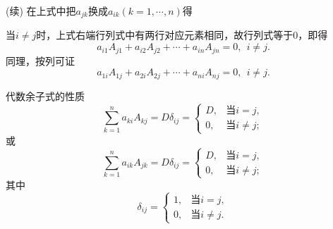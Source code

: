 \begin{frame}
  \begin{footnotesize}
    \proofname(续)
    在上式中把$a_{jk}$换成$a_{ik}(k=1,\cdots,n)$得
    \begin{center}
    \end{center}
    当$i\ne j$时，上式右端行列式中有两行对应元素相同，故行列式等于0，即得
    $$
    a_{i1} A_{j1} + a_{i2} A_{j2} + \cdots + a_{in} A_{jn} = 0, \ \ i\ne j.
    $$
    同理，按列可证
    $$
    a_{1i} A_{1j} + a_{2i} A_{2j} + \cdots + a_{ni} A_{nj} = 0, \ \ i\ne j.
    $$

  \end{footnotesize}
\end{frame}


\begin{frame}
  \begin{footnotesize}
    \begin{block}{代数余子式的性质}
      $$
      \sum_{k=1}^n a_{ki} A_{kj} = D \delta_{ij} = 
      \left \{
      \begin{array}{ll}
        D, & \mbox{当}i=j, \\[0.3cm]
        0, & \mbox{当}i\ne j;
      \end{array}
      \right.
      $$
      或
      $$
      \sum_{k=1}^n a_{ik} A_{jk} 
      = D \delta_{ij} = 
      \left \{
      \begin{array}{ll}
        D, & \mbox{当}i=j, \\[0.3cm]
        0, & \mbox{当}i\ne j;
      \end{array}
      \right.
      $$
      其中
      $$
      \delta_{ij} = \left \{
      \begin{array}{ll}
        1, & \mbox{当}i=j, \\[0.3cm]
        0, & \mbox{当}i\ne j.
      \end{array}
      \right.
      $$
    \end{block}
  \end{footnotesize}
\end{frame}


